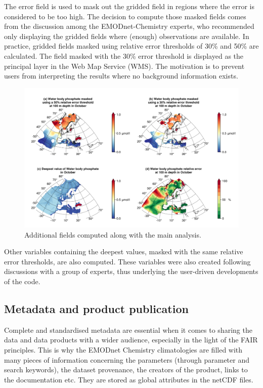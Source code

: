 \documentclass[essd,manuscript]{copernicus}
\begin{document}
The error field is used to mask out the gridded field in regions where the error is considered to be too high. The decision to compute those masked fields comes from the discussion among the EMODnet-Chemistry experts, who recommended only displaying the gridded fields where (enough) observations are available. In practice, gridded fields masked using relative error thresholds of 30\% and 50\% are calculated. The field masked with the 30\% error threshold is displayed as the principal layer in the Web Map Service (WMS). The motivation is to prevent users from interpreting the results where no background information exists. 

\begin{figure}[t]
\includegraphics[width=\textwidth]{Water_body_phosphate_depth-100_month-10_additional_fields.png}
\caption{Additional fields computed along with the main analysis.\label{fig:additionalfields}}
\end{figure}

Other variables containing the deepest values, masked with the same relative error thresholds, are also computed. These variables were also created following discussions with a group of experts, thus underlying the user-driven developments of the code.

\subsection{Metadata and product publication}

Complete and standardised metadata are essential when it comes to sharing the data and data products with a wider audience, especially in the light of the FAIR principles. This is why the EMODnet Chemistry climatologies are filled with many pieces of information concerning the parameters (through parameter and search keywords), the dataset provenance, the creators of the product, links to the documentation etc. They are stored as global attributes in the netCDF files.
\end{document}
